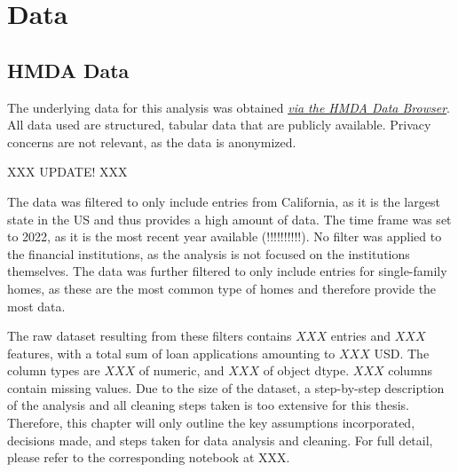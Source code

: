 \chapter{Data}\label{ch:Data}



\section{HMDA Data}\label{sec:HMDA_Data}


The underlying data for this analysis was obtained \textit{\href{https://ffiec.cfpb.gov/data-browser/data/2022?category=states}{via the HMDA Data Browser}}. \@
All data used are structured, tabular data that are publicly available. Privacy concerns are not relevant, as the data is anonymized.

XXX UPDATE! XXX

The data was filtered to only include entries from California, as it is the largest state in the US and thus provides a high amount of data. 
The time frame was set to 2022, as it is the most recent year available (!!!!!!!!!!). No filter was applied to the financial institutions, as the analysis is not focused on the institutions themselves. 
The data was further filtered to only include entries for single-family homes, as these are the most common type of homes and therefore provide the most data.

The raw dataset resulting from these filters contains $XXX$ entries and $XXX$ features, with a total sum of loan applications amounting to $XXX$ USD. The column types are $XXX$ of numeric, and $XXX$ of object dtype. $XXX$ columns contain missing values. \@
Due to the size of the dataset, a step-by-step description of the analysis and all cleaning steps taken is too extensive for this thesis. Therefore, this chapter will only outline the key assumptions incorporated, decisions made, and steps taken for data analysis and cleaning. For full detail, please refer to the corresponding notebook at XXX.

